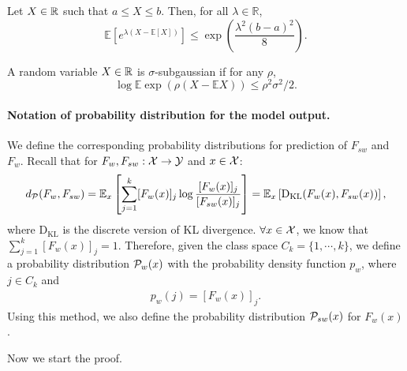 \begin{lemma} \label{hoeffding_lemma}
Let $X \in \mathbb{R}$ such that $a \leq X \leq b$. Then, for all $\lambda \in \mathbb{R}$,
$$\mathbb{E}\left[e^{\lambda(X-\mathbb{E}[X])}\right] \leq \exp \left(\frac{\lambda^2(b-a)^2}{8}\right).$$
\end{lemma}

\begin{definition}
A random variable $X \in \mathbb{R}$ is $\sigma$-subgaussian if for any $\rho$, 
$$\log \mathbb{E} \exp (\rho(X-\mathbb{E} X)) \leq \rho^2 \sigma^2 / 2.$$
\end{definition}


\paragraph{Notation of probability distribution for the model output.}
We define the corresponding probability distributions for prediction of $F_{sw}$ and $F_w$.
Recall that for $F_w, F_{sw}: \mathcal{X} \to \mathcal{Y}$ and $x \in \mathcal{X}$:
$$d_\mathcal{P}(F_w, F_{sw}) = \mathbb{E}_x \left[ \sum_{j=1}^k [F_w(x)]_j \log \frac{[F_w(x)]_j}{[F_{sw}(x)]_j} \right] = \mathbb{E}_x \left[ \mathrm{D}_{\mathrm{KL}}(F_w(x), F_{sw}(x)) \right],$$
where $\mathrm{D}_{\mathrm{KL}}$ is the discrete version of KL divergence. 
$\forall x \in \mathcal{X}$, we know that $\sum_{j=1}^k [F_w(x)]_j = 1$. Therefore, given the class space $C_k = \{ 1, \cdots, k \}$, we define a probability distribution $\mathcal{P}_{w}(x)$ with the probability density function $p_w$, where $j \in C_k$ and 
\begin{align} \label{def_new_distribution}
    p_w(j)=[F_w(x)]_j.
\end{align}
Using this method, we also define the probability distribution $\mathcal{P}_{sw}(x)$ for $F_{w}(x)$.



Now we start the proof.


